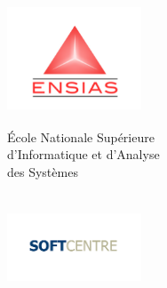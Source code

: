 \documentclass[12pt,a4paper]{report}
\makeatletter
\newcommand\frontmatter{%
	\cleardoublepage
	\pagenumbering{roman}}
\makeatother
\begin{document}
	\frontmatter
	\pagestyle{fancy}
	\fancyhf{}
	\fancyhf[HR]{\thepage}
	\fancyhf[HL]{\leftmark}
	\hyphenation{}
	
	
	\begin{titlepage}
		
		\begin{center}


		\begin{minipage}{0.5\textwidth}

		\begin{flushleft}
		\includegraphics[width=4cm,height=3.2cm]{graphics/ensias.png}\\
		\begin{flushleft}
		 { \scriptsize  \'Ecole Nationale Supérieure \\[0.2cm]d’Informatique et d’Analyse\\ \hspace{10mm}des Systèmes  }

		\end{flushleft}

		 

		\end{flushleft}

		\end{minipage}
		\begin{minipage}{0.4\textwidth}
		\begin{flushright}
		\includegraphics[width=4cm,height=3.2cm]{graphics/logo_softcentre.png}\\
		\end{flushright}


\end{minipage}
\end{center}
\end{titlepage}
\end{document}
